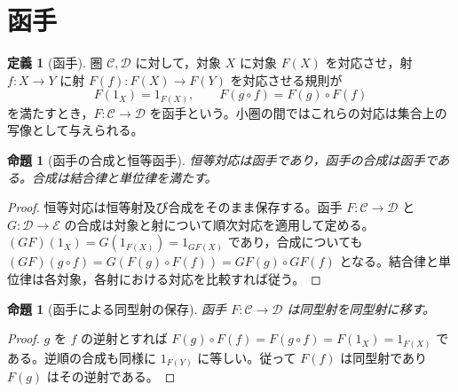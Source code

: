 \documentclass[a5paper,10pt,dvipdfmx]{jsarticle}
\theoremstyle{definition}
\newtheorem{defn}[ruledef]{定義}
\theoremstyle{plain}
\newtheorem{prop}[ruledef]{命題}
\begin{document}
\section{函手}
\begin{defn}[函手]\label{k245}
圏 $\mathcal C,\mathcal D$ に対して，対象 $X$ に対象 $F(X)$ を対応させ，射 $f:X\to Y$ に射 $F(f):F(X)\to F(Y)$ を対応させる規則が
\[
 F(1_X)=1_{F(X)},\qquad
 F(g\circ f)=F(g)\circ F(f)
\]
を満たすとき，$F:\mathcal C\to\mathcal D$ を函手という。小圏の間ではこれらの対応は集合上の写像として与えられる。
\end{defn}
\begin{prop}[函手の合成と恒等函手]\label{k246}
恒等対応は函手であり，函手の合成は函手である。合成は結合律と単位律を満たす。
\end{prop}
\begin{proof}
恒等対応は恒等射及び合成をそのまま保存する。函手 $F:\mathcal C\to\mathcal D$ と $G:\mathcal D\to\mathcal E$ の合成は対象と射について順次対応を適用して定める。$(GF)(1_X)=G(1_{F(X)})=1_{GF(X)}$ であり，合成についても $(GF)(g\circ f)=G(F(g)\circ F(f))=GF(g)\circ GF(f)$ となる。結合律と単位律は各対象，各射における対応を比較すれば従う。
\end{proof}
\begin{prop}[函手による同型射の保存]\label{k247}
函手 $F:\mathcal C\to\mathcal D$ は同型射を同型射に移す。
\end{prop}
\begin{proof}
$g$ を $f$ の逆射とすれば $F(g)\circ F(f)=F(g\circ f)=F(1_X)=1_{F(X)}$ である。逆順の合成も同様に $1_{F(Y)}$ に等しい。従って $F(f)$ は同型射であり $F(g)$ はその逆射である。
\end{proof}
\end{document}
